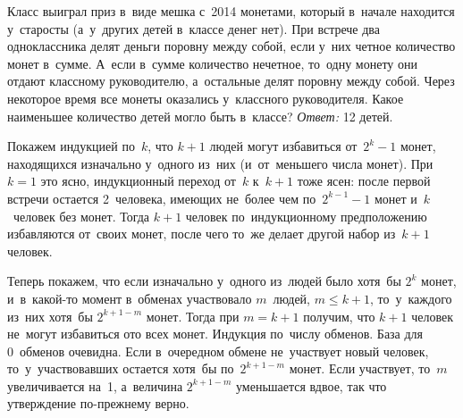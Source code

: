 \problem
Класс выиграл приз в~виде мешка с~2014 монетами, который в~начале находится
у~старосты (а~у~других детей в~классе денег нет).
При встрече два одноклассника делят деньги поровну между собой, если у~них
четное количество монет в~сумме.
А~если в~сумме количество нечетное, то~одну монету они отдают классному
руководителю, а~остальные делят поровну между собой.
Через некоторое время все монеты оказались у~классного руководителя.
Какое наименьшее количество детей могло быть в~классе?
\solution
\emph{Ответ:} 12 детей.
\par
Покажем индукцией по~$k$, что $k+1$ людей могут избавиться от~$2^k-1$ монет,
находящихся изначально у~одного из~них (и~от~меньшего числа монет).
При $k = 1$ это ясно, индукционный переход от~$k$ к~$k + 1$ тоже ясен: после
первой встречи остается 2~человека, имеющих не~более чем по~$2^{k-1} - 1$ монет
и~$k$~человек без монет.
Тогда $k + 1$ человек по~индукционному предположению избавляются от~своих
монет, после чего то~же делает другой набор из~$k + 1$ человек.
\par
Теперь покажем, что если изначально у~одного из~людей было хотя~бы $2^k$ монет,
и~в~какой-то момент в~обменах участвовало $m$~людей, $m \leq k + 1$,
то~у~каждого из~них хотя~бы $2^{k + 1 - m}$ монет.
Тогда при $m = k + 1$ получим, что $k+1$ человек не~могут избавиться ото всех
монет.
Индукция по~числу обменов.
База для 0~обменов очевидна.
Если в~очередном обмене не~участвует новый человек, то~у~участвовавших остается
хотя~бы по~$2^{k+1-m}$ монет.
Если участвует, то~$m$ увеличивается на~1, а~величина $2^{k + 1 - m}$
уменьшается вдвое, так что утверждение по-прежнему верно.
\endproblem
